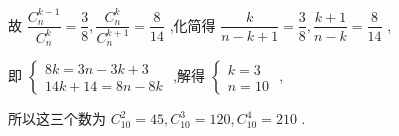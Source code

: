 \begin{enumerate}
\begin{enumerate}
\begin{jieda}
\begin{enumerate}
                故 $\dfrac{{{C}}_{n}^{k - 1}}{{{C}}_{n}^{k}} = \dfrac{3}{8},\dfrac{{{C}}_{n}^{k}}{{{C}}_{n}^{k + 1}} = \dfrac{8}{14}$ ,化简得 $\dfrac{k}{n - k + 1} = \dfrac{3}{8},\dfrac{k + 1}{n - k} = \dfrac{8}{14}$ ,
                
                即 $\left\{  \begin{matrix} {8k} = {3n} - {3k} + 3 \\  {14k} + {14} = {8n} - {8k} \end{matrix}\right.$ ,解得 $\left\{  \begin{array}{l} k = 3 \\  n = {10} \end{array}\right.$ ,
                
                所以这三个数为 ${{C}}_{10}^{2} = {45},{{C}}_{10}^{3} = {120},{{C}}_{10}^{4} = {210}$ .
            \end{enumerate}
        \end{jieda}
    \end{enumerate}
\end{enumerate}